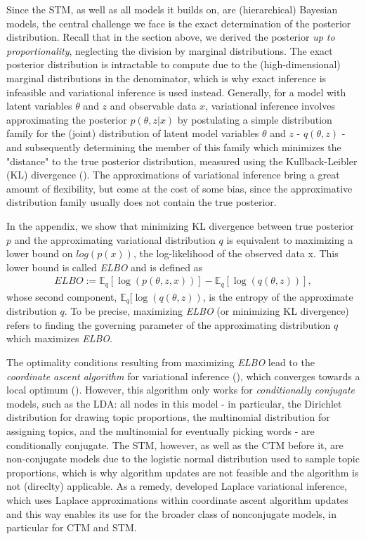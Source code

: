 Since the STM, as well as all models it builds on, are (hierarchical) Bayesian models, the central challenge we face is the exact determination of the posterior distribution. Recall that in the section above, we derived the posterior \textit{up to proportionality}, neglecting the division by marginal distributions. The exact posterior distribution is intractable to compute due to the (high-dimensional) marginal distributions in the denominator, which is why exact inference is infeasible and variational inference is used instead. Generally, for a model with latent variables $\theta$ and $z$ and observable data $x$, variational inference involves approximating the posterior $p(\theta,z|x)$ by postulating a simple distribution family for the (joint) distribution of latent model variables $\theta$ and $z$ - $q(\theta,z)$ - and subsequently determining the member of this family which minimizes the "distance" to the true posterior distribution, measured using the Kullback-Leibler (KL) divergence (\citealp{wang2013variational}). The approximations of variational inference bring a great amount of flexibility, but come at the cost of some bias, since the approximative distribution family usually does not contain the true posterior.

In the appendix, we show that minimizing KL divergence between true posterior $p$ and the approximating variational distribution $q$ is equivalent to maximizing a lower bound on $log(p(x))$, the log-likelihood of the observed data x. This lower bound is called \textit{ELBO} and is defined as
\begin{align*}
ELBO := \mathbb{E}_q[\log(p(\theta,z,x))] - \mathbb{E}_q[\log(q(\theta,z))],
\end{align*}
whose second component, $\mathbb{E}_q[\log(q(\theta,z))$, is the entropy of the approximate distribution $q$. To be precise, maximizing \textit{ELBO} (or minimizing KL divergence) refers to finding the governing parameter of the approximating distribution $q$ which maximizes \textit{ELBO}.

The optimality conditions resulting from maximizing \textit{ELBO} lead to the \textit{coordinate ascent algorithm} for variational inference (\citealp{wang2013variational}), which converges towards a local optimum (\citealp{bishop2006pattern}). However, this algorithm only works for \textit{conditionally conjugate} models, such as the LDA: all nodes in this model - in particular, the Dirichlet distribution for drawing topic proportions, the multinomial distribution for assigning topics, and the multinomial for eventually picking words - are conditionally conjugate. The STM, however, as well as the CTM before it, are non-conjugate models due to the logistic normal distribution used to sample topic proportions, which is why algorithm updates are not feasible and the algorithm is not (direclty) applicable. As a remedy, \cite{wang2013variational} developed Laplace variational inference, which uses Laplace approximations within coordinate ascent algorithm updates and this way enables its use for the broader class of nonconjugate models, in particular for CTM and STM.

